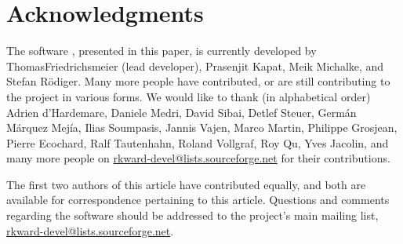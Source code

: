 \documentclass[article,shortnames]{jss}
\begin{document}
%

\section*{Acknowledgments}
\label{sec:acknowledgments}
The software , presented in this paper, is currently developed by Thomas\linebreak Friedrichsmeier (lead developer), Prasenjit Kapat, Meik Michalke,
and Stefan R\"odiger. Many more people have contributed, or are still contributing to the project in various forms. We would like to
thank (in alphabetical order) Adrien d'Hardemare, Daniele Medri, David Sibai, Detlef Steuer, Germ\'an M\'arquez Mej\'ia,
Ilias Soumpasis, Jannis Vajen, Marco Martin, Philippe Grosjean, Pierre Ecochard, Ralf Tautenhahn, Roland Vollgraf, Roy Qu,
Yves Jacolin, and many more people on \url{rkward-devel@lists.sourceforge.net} for their contributions.

The first two authors of this article have contributed equally, and both are available for correspondence pertaining to this article. Questions and comments
regarding the software  should be addressed to the project's main mailing list, \url{rkward-devel@lists.sourceforge.net}.


\end{document}
